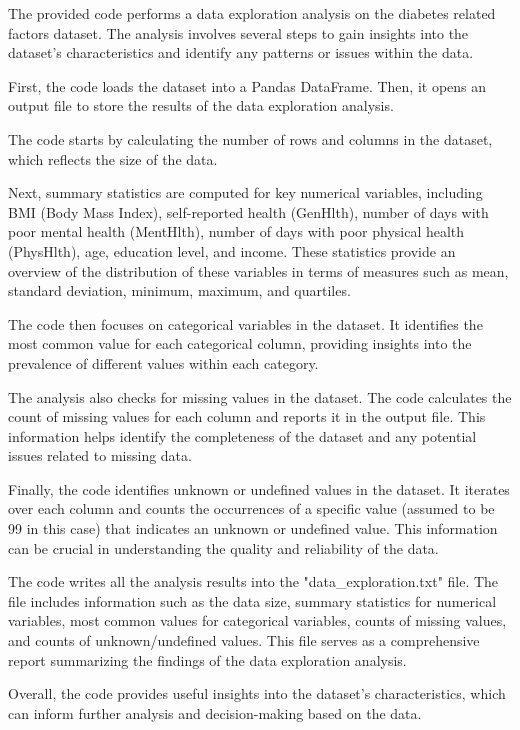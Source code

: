 \documentclass[11pt]{article}
\begin{document}
The provided code performs a data exploration analysis on the diabetes related factors dataset. The analysis involves several steps to gain insights into the dataset's characteristics and identify any patterns or issues within the data.

First, the code loads the dataset into a Pandas DataFrame. Then, it opens an output file to store the results of the data exploration analysis.

The code starts by calculating the number of rows and columns in the dataset, which reflects the size of the data.

Next, summary statistics are computed for key numerical variables, including BMI (Body Mass Index), self-reported health (GenHlth), number of days with poor mental health (MentHlth), number of days with poor physical health (PhysHlth), age, education level, and income. These statistics provide an overview of the distribution of these variables in terms of measures such as mean, standard deviation, minimum, maximum, and quartiles.

The code then focuses on categorical variables in the dataset. It identifies the most common value for each categorical column, providing insights into the prevalence of different values within each category.

The analysis also checks for missing values in the dataset. The code calculates the count of missing values for each column and reports it in the output file. This information helps identify the completeness of the dataset and any potential issues related to missing data.

Finally, the code identifies unknown or undefined values in the dataset. It iterates over each column and counts the occurrences of a specific value (assumed to be 99 in this case) that indicates an unknown or undefined value. This information can be crucial in understanding the quality and reliability of the data.

The code writes all the analysis results into the "data\_exploration.txt" file. The file includes information such as the data size, summary statistics for numerical variables, most common values for categorical variables, counts of missing values, and counts of unknown/undefined values. This file serves as a comprehensive report summarizing the findings of the data exploration analysis.

Overall, the code provides useful insights into the dataset's characteristics, which can inform further analysis and decision-making based on the data.
\end{document}
